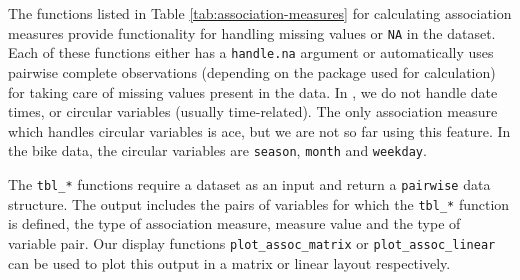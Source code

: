 \begin{table}

\caption{\label{tab:association-measures}List of the functions available in the package for calculating different association measures along with the packages used for calculation.}
\centering
{}
\end{table}

The functions listed in Table \ref{tab:association-measures} for calculating association measures provide functionality for handling missing values or \texttt{NA} in the dataset. Each of these functions either has a \texttt{handle.na} argument or automatically uses pairwise complete observations (depending on the package used for calculation) for taking care of missing values present in the data. In , we do not handle date times, or circular variables (usually time-related). The only association measure which handles circular variables is ace, but we are not so far using this feature. In the bike data, the circular variables are \texttt{season}, \texttt{month} and \texttt{weekday}.

The \texttt{tbl\_*} functions require a dataset as an input and return a \texttt{pairwise} data structure. The output includes the pairs of variables for which the \texttt{tbl\_*} function is defined, the type of association measure, measure value and the type of variable pair. Our display functions \texttt{plot\_assoc\_matrix} or \texttt{plot\_assoc\_linear} can be used to plot this output in a matrix or linear layout respectively.

